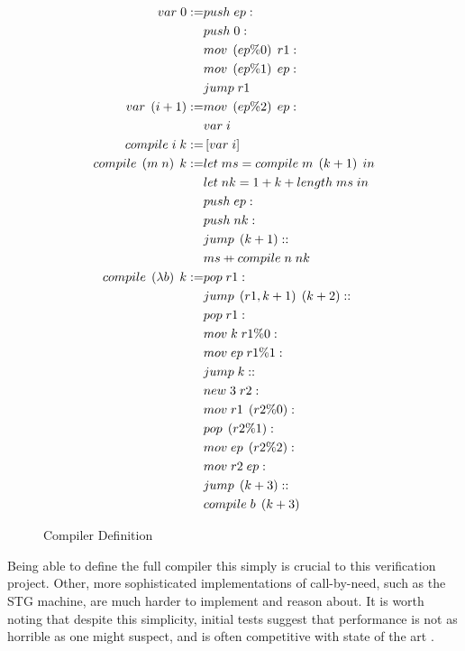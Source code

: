 \begin{figure}
\begin{align*}
var \; 0 := 
  &push \; ep : \\
  &push \; 0 : \\
  &mov \; \left(ep\%0\right) \; r1 : \\
  &mov \; \left(ep\%1\right) \; ep : \\
  &jump \; r1 \\
var \; \left(i+1\right) :=
  &mov \; \left(ep\%2\right) \; ep : \\
  &var \; i \\
compile \; i \; k :=& \left[var \; i\right] \\
compile \; \left( m \; n \right) \; k :=
  &let \; ms = compile \; m \; \left(k+1\right) \; in \\
  &let \; nk = 1+k+length \; ms \; in \\
  &push \; ep :  \\
  &push \; nk : \\
  &jump \; \left(k+1\right) :: \\
  &ms \concat compile \; n \; nk \\
compile \; \left(\lambda b\right) \; k :=
  &pop \; r1 : \\
  &jump \; \left(r1, k+1 \right) \; \left(k+2\right) :: \\
  &pop \; r1 : \\
  &mov \; k \; r1\%0 : \\
  &mov \; ep \; r1\%1 : \\
  &jump \; k :: \\
  &new \; 3 \; r2 : \\
  &mov \; r1 \; \left(r2\%0\right) : \\
  &pop \; \left(r2\%1\right) : \\
  &mov \; ep \; \left(r2\%2\right) : \\
  &mov \; r2 \; ep : \\
  &jump \; \left(k+3\right) :: \\
  &compile \; b \; \left(k+3\right)
\end{align*}
\caption{Compiler Definition}
\label{fig:compiler}
\end{figure}

Being able to define the full compiler this simply is crucial to this
verification project. Other, more sophisticated implementations of call-by-need,
such as the STG machine, are much harder to implement and reason about. It is
worth noting that despite this simplicity, initial tests suggest that performance
is not as horrible as one might suspect, and is often competitive with state of
the art \cite{cem}.

